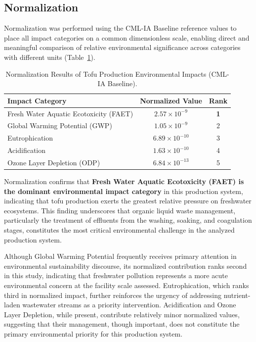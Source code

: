 \documentclass[12pt,a4paper]{article}
\begin{document}
\subsection{Normalization}

Normalization was performed using the CML-IA Baseline reference values to place all impact categories
on a common dimensionless scale, enabling direct and meaningful comparison of relative environmental
significance across categories with different units (Table~\ref{tab:norm}).

\begin{table}[H]
\centering
\caption{Normalization Results of Tofu Production Environmental Impacts (CML-IA Baseline).}
\label{tab:norm}
\small
\begin{tabular}{lcc}
\toprule
\textbf{Impact Category} & \textbf{Normalized Value} & \textbf{Rank}\\
\midrule
Fresh Water Aquatic Ecotoxicity (FAET) & $2.57\times10^{-9}$  & \textbf{1} \\
Global Warming Potential (GWP)         & $1.05\times10^{-9}$  & 2 \\
Eutrophication                         & $6.89\times10^{-10}$ & 3 \\
Acidification                          & $1.63\times10^{-10}$ & 4 \\
Ozone Layer Depletion (ODP)            & $6.84\times10^{-13}$ & 5 \\
\bottomrule
\end{tabular}
\end{table}

Normalization confirms that \textbf{Fresh Water Aquatic Ecotoxicity (FAET) is the dominant
environmental impact category} in this production system, indicating that tofu production exerts the
greatest relative pressure on freshwater ecosystems. This finding underscores that organic liquid waste
management, particularly the treatment of effluents from the washing, soaking, and coagulation stages,
constitutes the most critical environmental challenge in the analyzed production system.

Although Global Warming Potential frequently receives primary attention in environmental sustainability
discourse, its normalized contribution ranks second in this study, indicating that freshwater pollution
represents a more acute environmental concern at the facility scale assessed. Eutrophication, which
ranks third in normalized impact, further reinforces the urgency of addressing nutrient-laden
wastewater streams as a priority intervention. Acidification and Ozone Layer Depletion, while present,
contribute relatively minor normalized values, suggesting that their management, though important, does
not constitute the primary environmental priority for this production system.
\end{document}

